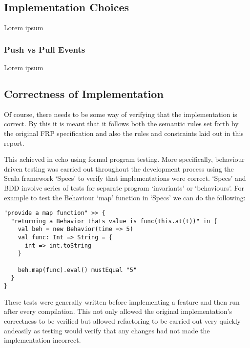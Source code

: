 \documentclass[12pt]{article}
\begin{document}
      
    \subsection{Implementation Choices}
      Lorem ipsum
      
      \subsubsection{Push vs Pull Events}
        Lorem ipsum
        
    
    \subsection{Correctness of Implementation}
      Of course, there needs to be some way of verifying that the implementation is correct. By
      this it is meant that it follows both the semantic rules set forth by the original FRP specification
      and also the rules and constraints laid out in this report.
      
      This achieved in echo using formal program testing. More specifically, behaviour driven
      testing was carried out throughout the development process using the Scala framework `Specs'
      to verify that implementations were correct. `Specs' and BDD involve series of tests for
      separate program `invariants' or `behaviours'. For example to test the Behaviour `map' function
      in `Specs' we can do the following:
 
\begin{verbatim}
"provide a map function" >> {
  "returning a Behavior thats value is func(this.at(t))" in {
    val beh = new Behavior(time => 5)
    val func: Int => String = {
      int => int.toString
    }

    beh.map(func).eval() mustEqual "5"
  }
}
\end{verbatim}      

    These tests were generally written before implementing a feature and then run after every compilation. 
    This not only allowed the original implementation's correctness to be verified but
    allowed refactoring to be carried out very quickly andeasily as testing would verify that any changes had not
    made the implementation incorrect.
      
\end{document}
